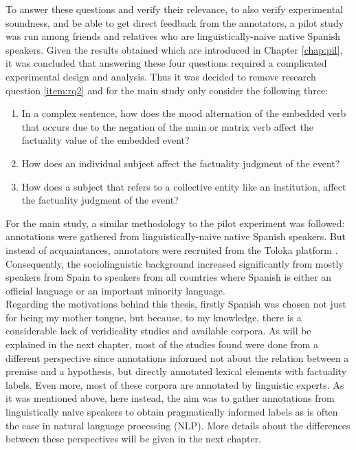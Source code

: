 To answer these questions and verify their relevance, to also verify experimental soundness, and be able to get direct feedback from the annotators, a pilot study was run among friends and relatives who are linguistically-naive native Spanish speakers. Given the results obtained which are introduced in Chapter \ref{chap:pil}, it was concluded that answering these four questions required a complicated experimental design and analysis. Thus it was decided to remove research question \ref{item:rq2} and for the main study only consider the following three:\\

\begin{enumerate}[RQ1.-]
        \item In a complex sentence, how does the mood alternation of the embedded verb that occurs due to the negation of the main or matrix verb affect the factuality value of the embedded event?
        \item How does an individual subject affect the factuality judgment of the event?
        \item How does a subject that refers to a collective entity like an institution, affect the factuality judgment of the event?\label{item:rq4}
\end{enumerate}

For the main study, a similar methodology to the pilot experiment was followed: annotations were gathered from linguistically-naive native Spanish speakers. But instead of acquaintances, annotators were recruited from the Toloka platform \citep{Pavlichenko2021crowdspeech}. Consequently, the sociolinguistic background increased significantly from mostly speakers from Spain to speakers from all countries where Spanish is either an official language or an important minority language.\\

Regarding the motivations behind this thesis, firstly Spanish was chosen not just for being my mother tongue, but because, to my knowledge, there is a considerable lack of veridicality studies and available corpora. As will be explained in the next chapter, most of the studies found were done from a different perspective since annotations informed not about the relation between a premise and a hypothesis, but directly annotated lexical elements with factuality labels. Even more, most of these corpora are annotated by linguistic experts. As it was mentioned above, here instead, the aim was to gather annotations from linguistically naive speakers to obtain pragmatically informed labels as is often the case in natural language processing (NLP). More details about the differences between these perspectives will be given in the next chapter.\\

